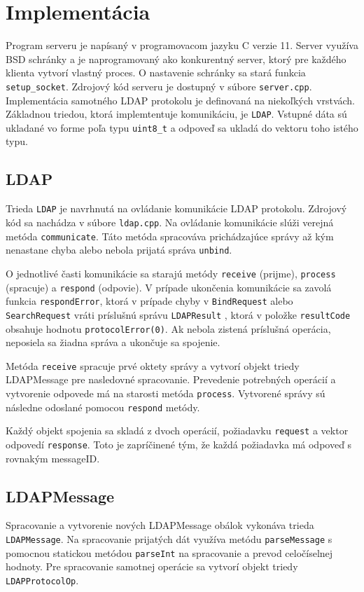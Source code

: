 \documentclass[11pt,a4paper]{article}
\begin{document}
\section{Implementácia}
Program serveru je napísaný v programovacom jazyku C verzie 11. Server využíva BSD schránky a je naprogramovaný ako konkurentný server, ktorý pre každého klienta vytvorí vlastný proces. O nastavenie schránky sa stará funkcia \verb|setup_socket|. Zdrojový kód serveru je dostupný v súbore \texttt{server.cpp}. Implementácia samotného LDAP protokolu je definovaná na niekoľkých vrstvách. Základnou triedou, ktorá implemtentuje komunikáciu, je \texttt{LDAP}. Vstupné dáta sú ukladané vo forme poľa typu \verb|uint8_t| a odpoveď sa ukladá do vektoru toho istého typu.  

\subsection{LDAP}
Trieda \texttt{LDAP} je navrhnutá na ovládanie komunikácie LDAP protokolu. Zdrojový kód sa nachádza v súbore \texttt{ldap.cpp}. Na ovládanie komunikácie slúži verejná metóda \texttt{communicate}. Táto metóda spracováva prichádzajúce správy až kým nenastane chyba alebo nebola prijatá správa \texttt{unbind}.

O jednotlivé časti komunikácie sa starajú metódy \texttt{receive} (prijme), \texttt{process} (spracuje) a \texttt{respond} (odpovie). V prípade ukončenia komunikácie sa zavolá funkcia \texttt{respondError}, ktorá v prípade chyby v \texttt{BindRequest} alebo \texttt{SearchRequest} vráti príslušnú správu \texttt{LDAPResult} , ktorá v položke \texttt{resultCode} obsahuje hodnotu \texttt{protocolError(0)}. Ak nebola zistená príslušná operácia, neposiela sa žiadna správa a ukončuje sa spojenie.

Metóda \texttt{receive} spracuje prvé oktety správy a vytvorí objekt triedy LDAPMessage pre nasledovné spracovanie. Prevedenie potrebných operácií a vytvorenie odpovede má na starosti metóda \texttt{process}. Vytvorené správy sú následne odoslané pomocou \texttt{respond} metódy. 

Každý objekt spojenia sa skladá z dvoch operácií, požiadavku \texttt{request} a vektor odpovedí \texttt{response}. Toto je zapríčinené tým, že každá požiadavka má odpoveď s rovnakým messageID.  

\subsection{LDAPMessage}
Spracovanie a vytvorenie nových LDAPMessage obálok vykonáva trieda \texttt{LDAPMessage}. Na spracovanie prijatých dát využíva metódu \texttt{parseMessage} s pomocnou statickou metódou \texttt{parseInt} na spracovanie a prevod celočíselnej hodnoty. Pre spracovanie samotnej operácie sa vytvorí objekt triedy \texttt{LDAPProtocolOp}. 
\end{document}
